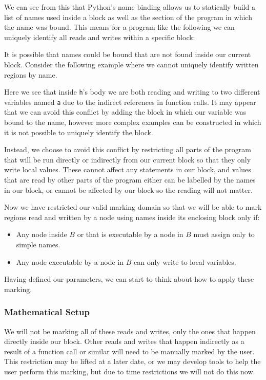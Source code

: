 \documentclass{report}
\begin{document}
We can see from this that Python's name binding allows us to statically build a list of names used inside a block as well as the section of the program in
which the name was bound. This means for a program like the following we can uniquely identify all reads and writes within a specific block:



It is possible that names could be bound that are not found inside our current block. Consider the following example where we cannot uniquely identify
written regions by name.



Here we see that inside \texttt{h}'s body we are both reading and writing to two different variables named \texttt{a} due to the indirect references in
function calls. It may appear that we can avoid this conflict by adding the block in which our variable was bound to the name, however more complex
examples can be constructed in which it is not possible to uniquely identify the block.

Instead, we choose to avoid this conflict by restricting all parts of the program that will be run directly or indirectly from our current block so that
they only write local values. These cannot affect any statements in our block, and values that are read by other parts of the program either can be labelled
by the names in our block, or cannot be affected by our block so the reading will not matter.

Now we have restricted our valid marking domain so that we will be able to mark regions read and written by a node using names inside its enclosing block
only if:

\begin{itemize}
\item Any node inside $B$ or that is executable by a node in $B$ must assign only to simple names.
\item Any node executable by a node in $B$ can only write to local variables.
\end{itemize}

Having defined our parameters, we can start to think about how to apply these marking.

\subsubsection{Mathematical Setup}

We will not be marking all of these reads and writes, only the ones that happen directly inside our block. Other reads and writes that happen indirectly as a
result of a function call or similar will need to be manually marked by the user. This restriction may be lifted at a later date, or we may develop tools to help
the user perform this marking, but due to time restrictions we will not do this now.
\end{document}
